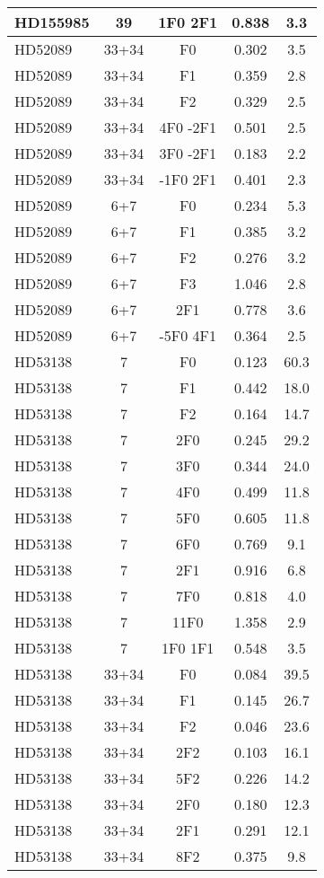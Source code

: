 \begin{table*}
\begin{tabular}{l c c c c}
HD155985 & 39 & 1F0 2F1 & 0.838 & 3.3\\ 
\hline
HD52089 & 33+34 & F0 & 0.302 & 3.5\\ 
HD52089 & 33+34 & F1 & 0.359 & 2.8\\ 
HD52089 & 33+34 & F2 & 0.329 & 2.5\\ 
HD52089 & 33+34 & 4F0 -2F1 & 0.501 & 2.5\\ 
HD52089 & 33+34 & 3F0 -2F1 & 0.183 & 2.2\\ 
HD52089 & 33+34 & -1F0 2F1 & 0.401 & 2.3\\ 
\hline
HD52089 & 6+7 & F0 & 0.234 & 5.3\\ 
HD52089 & 6+7 & F1 & 0.385 & 3.2\\ 
HD52089 & 6+7 & F2 & 0.276 & 3.2\\ 
HD52089 & 6+7 & F3 & 1.046 & 2.8\\ 
HD52089 & 6+7 & 2F1 & 0.778 & 3.6\\ 
HD52089 & 6+7 & -5F0 4F1 & 0.364 & 2.5\\ 
\hline
HD53138 & 7 & F0 & 0.123 & 60.3\\ 
HD53138 & 7 & F1 & 0.442 & 18.0\\ 
HD53138 & 7 & F2 & 0.164 & 14.7\\ 
HD53138 & 7 & 2F0 & 0.245 & 29.2\\ 
HD53138 & 7 & 3F0 & 0.344 & 24.0\\ 
HD53138 & 7 & 4F0 & 0.499 & 11.8\\ 
HD53138 & 7 & 5F0 & 0.605 & 11.8\\ 
HD53138 & 7 & 6F0 & 0.769 & 9.1\\ 
HD53138 & 7 & 2F1 & 0.916 & 6.8\\ 
HD53138 & 7 & 7F0 & 0.818 & 4.0\\ 
HD53138 & 7 & 11F0 & 1.358 & 2.9\\ 
HD53138 & 7 & 1F0 1F1 & 0.548 & 3.5\\ 
\hline
HD53138 & 33+34 & F0 & 0.084 & 39.5\\ 
HD53138 & 33+34 & F1 & 0.145 & 26.7\\ 
HD53138 & 33+34 & F2 & 0.046 & 23.6\\ 
HD53138 & 33+34 & 2F2 & 0.103 & 16.1\\ 
HD53138 & 33+34 & 5F2 & 0.226 & 14.2\\ 
HD53138 & 33+34 & 2F0 & 0.180 & 12.3\\ 
HD53138 & 33+34 & 2F1 & 0.291 & 12.1\\ 
HD53138 & 33+34 & 8F2 & 0.375 & 9.8\\ 

\end{tabular}
\end{table*}
